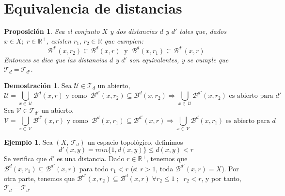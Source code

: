\documentclass[12pt,twoside]{report}
\newcommand\mc[1]{\mathcal{#1}}
\theoremstyle{azul}
\theoremstyle{azul2}
\theoremstyle{plain}
\newtheorem*{prop}{Proposición}
\theoremstyle{definition}
\newtheorem*{eje}{Ejemplo}
\newtheorem*{dem}{Demostración}
\theoremstyle{remark}
\begin{document}
\section{Equivalencia de distancias}
\begin{prop}
Sea el conjunto $X$ y dos distancias $d$ y $d'$ tales que, dados $x \in X;\; r \in \mathbb{R^+}$, existen $r_1,\, r_2 \in \mathbb{R}$ que cumplen:
$$\mathcal{B}^{d'}(x,r_2) \subseteq \mathcal{B}^{d}(x,r) \: \text{ y } \: \mathcal{B}^{d}(x,r_1) \subseteq \mathcal{B}^{d'}(x,r)$$
Entonces se dice que las distancias $d$ y $d'$ son equivalentes, y se cumple que $\mc{T}_d = \mc{T}_{d'}$.
\end{prop}
\begin{dem}
Sea $\mathcal{U} \in \mc{T}_d$ un abierto,
$$\mathcal{U}= \bigcup_{x \in \: \mathcal{U}} \mathcal{B}^{d}(x,r) \text{ y como } \: \mathcal{B}^{d'}(x,r_2) \subseteq \mathcal{B}^{d}(x,r_2) \Longrightarrow \bigcup_{x \in \: \mathcal{U}} \mathcal{B}^{d'}(x,r_2) \text{ es abierto para } d'$$
Sea $\mathcal{V} \in \mc{T}_{d'}$ un abierto,
$$\mathcal{V}= \bigcup_{x \in \: \mathcal{V}} \mathcal{B}^{d'}(x,r) \text{ y como } \: \mathcal{B}^{d}(x,r_1) \subseteq \mathcal{B}^{d'}(x,r) \Longrightarrow \bigcup_{x \in \: \mathcal{V}} \mathcal{B}^{d}(x,r_1) \text{ es abierto para } d$$ 
\end{dem}
\begin{eje} 
Sea $(X, \: \mc{T}_d) $ un espacio topológico, definimos 
$$d'(x,y)=min \{ 1, d(x,y) \} \leq d(x,y) < r$$
Se verifica que $d'$ es una distancia. Dado $r \in \mathbb{R}^+$, tenemos que $\mathcal{B}^{d}(x,r_1) \subseteq \mathcal{B}^{d'}(x,r)$ para todo $r_1 < r$ (si $r > 1$, toda $\mathcal{B}^{d'}(x,r) = X$). Por otra parte, tenemos que  $\mathcal{B}^{d'}(x,r_2) \subseteq \mathcal{B}^{d}(x,r) \; \forall r_2 \leq 1 \; ; \;\; r_2 < r$, y por tanto, $\mc{T}_d = \mc{T}_{d'}$\\

\end{eje}
\end{document}
